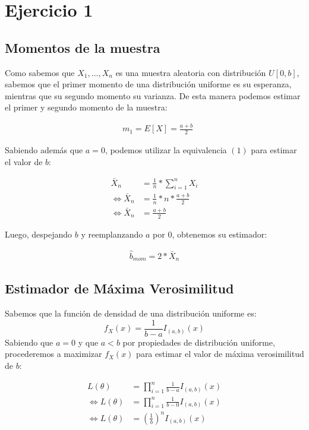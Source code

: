 \section{Ejercicio 1}
\subsection{Momentos de la muestra}
Como sabemos que $X_{1}, ..., X_{n}$ es una muestra aleatoria con distribución $U[0, b]$, sabemos que el primer momento de una distribución uniforme es su esperanza, mientras que su segundo momento su varianza. De esta manera podemos estimar el primer y segundo momento de la muestra:

\begin{align}
	&m_{1} = E[X] = \frac{a + b}{2} %
\end{align}

Sabiendo además que $a = 0$, podemos utilizar la equivalencia $(1)$ para estimar el valor de $b$:

\begin{align*}
	\bar{X}_{n} &= \frac{1}{n} * \sum_{i=1}^{n}X_{i} \\
	\iff \bar{X}_{n} &= \frac{1}{n} * n * \frac{a + b}{2} \\
	\iff \bar{X}_{n} &= \frac{a + b}{2}
\end{align*}

Luego, despejando $b$ y reemplanzando $a$ por $0$, obtenemos su estimador:

\begin{align*}
	\hat{b}_{mom} = 2 * \bar{X}_{n}
\end{align*}

\subsection{Estimador de Máxima Verosimilitud}
Sabemos que la función de densidad de una distribución uniforme es:
$$f_{X}(x)=\frac{1}{b - a}I_{(a, b)}(x)$$
Sabiendo que $a = 0$ y que $a < b$ por propiedades de distribución uniforme, procederemos a maximizar $f_{X}(x)$ para estimar el valor de máxima verosimilitud de $b$:

\begin{align*}
	L(\theta) &= \prod_{i=1}^{n}\frac{1}{b - a}I_{(a, b)}(x) \\
	\iff L(\theta) &= \prod_{i=1}^{n}\frac{1}{b - 0}I_{(a, b)}(x) \\
	\iff L(\theta) &= (\frac{1}{b})^n I_{(a, b)}(x)
\end{align*}

